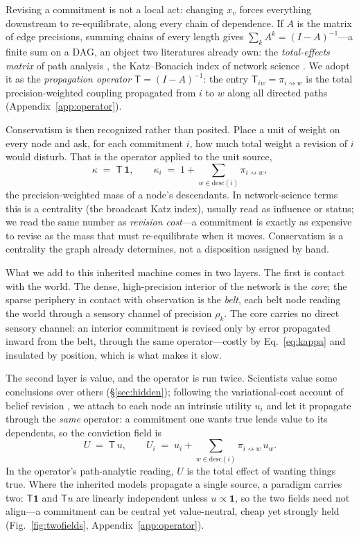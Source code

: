 \documentclass[runningheads]{llncs}
\newcommand{\desc}{\mathrm{desc}}
\newcommand{\rw}{\rightsquigarrow}
\newcommand{\Top}{\mathsf{T}}          %
\newcommand{\bone}{\mathbf{1}}         %
\begin{document}
Revising a commitment is not a local act: changing $x_v$ forces everything downstream to
re-equilibrate, along every chain of dependence. If $A$ is the matrix of edge precisions,
summing chains of every length gives $\sum_k A^k=(I-A)^{-1}$---a finite sum on a DAG, an object
two literatures already own: the \emph{total-effects matrix} of path analysis
\citep{wright1934,bollen1987}, the Katz--Bonacich index of network science
\citep{katz1953,bonacich1987,malioutov2006}. We adopt it as the \emph{propagation operator}
$\Top=(I-A)^{-1}$: the entry $\Top_{iw}=\pi_{i\rw w}$ is the total precision-weighted coupling
propagated from $i$ to $w$ along all directed paths (Appendix~\ref{app:operator}).

Conservatism is then recognized rather than posited. Place a unit of weight on every node and ask,
for each commitment $i$, how much total weight a revision of $i$ would disturb. That is the operator
applied to the unit source,
\begin{equation}
\kappa \;=\; \Top\,\bone,
\qquad
\kappa_i \;=\;1+\!\!\sum_{w\in\desc(i)}\!\!\pi_{i\rw w},
\label{eq:kappa}
\end{equation}
the precision-weighted mass of a node's descendants. In network-science terms this is a
centrality (the broadcast Katz index), usually read as influence or status; we read the same
number as \emph{revision cost}---a commitment is exactly as expensive to revise as the mass that
must re-equilibrate when it moves. Conservatism is a centrality the graph already determines,
not a disposition assigned by hand.

What we add to this inherited machine comes in two layers. The first is contact with the world. The
dense, high-precision interior of the network is the \emph{core}; the sparse periphery in contact
with observation is the \emph{belt}, each belt node reading the world through a sensory channel of
precision $\rho_k$. The core carries no direct sensory channel: an interior commitment is revised
only by error propagated inward from the belt, through the same operator---costly by
Eq.~\eqref{eq:kappa} and insulated by position, which is what makes it slow.

The second layer is value, and the operator is run twice. Scientists value some conclusions over
others (\S\ref{sec:hidden}); following the variational-cost account of belief
revision \citep{hyland2025}, we attach to each node an intrinsic utility $u_i$ and let it propagate
through the \emph{same} operator: a commitment one wants true lends value to its dependents, so the
conviction field is
\begin{equation}
U \;=\; \Top\,u,
\qquad
U_i \;=\; u_i+\!\!\sum_{w\in\desc(i)}\!\!\pi_{i\rw w}\,u_w .
\label{eq:U}
\end{equation}
In the operator's path-analytic reading, $U$ is the total effect of wanting things true. Where the
inherited models propagate a single source, a paradigm carries two: $\Top\bone$ and $\Top u$ are
linearly independent unless $u\propto\bone$, so the two fields need not align---a commitment can
be central yet value-neutral, cheap yet strongly held (Fig.~\ref{fig:twofields},
Appendix~\ref{app:operator}).
\end{document}
